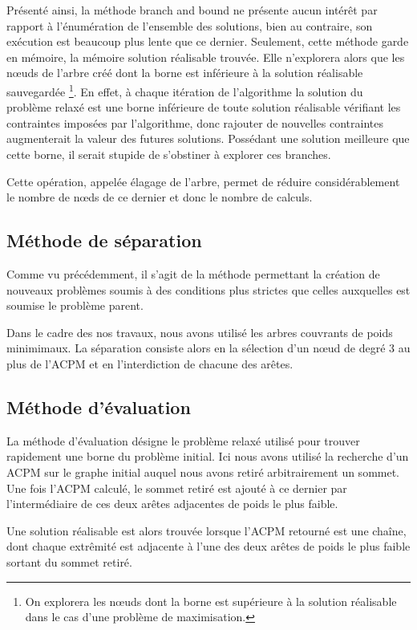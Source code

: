 Présenté ainsi, la méthode branch and bound ne présente aucun intérêt par rapport à l'énumération de
l'ensemble des solutions, bien au contraire, son exécution est beaucoup plus lente que ce dernier.
Seulement, cette méthode garde en mémoire, la mémoire solution réalisable trouvée. Elle n'explorera
alors que les n\oe uds de l'arbre créé dont la borne est inférieure à la solution réalisable
sauvegardée \footnote{On explorera les n\oe uds dont la borne est supérieure à la solution
réalisable dans le cas d'une problème de maximisation.}. En effet, à chaque itération de
l'algorithme la solution du problème relaxé est une borne inférieure de toute solution réalisable
vérifiant les contraintes imposées par l'algorithme, donc rajouter de nouvelles contraintes
augmenterait la valeur des futures solutions. Possédant une solution meilleure que cette borne, il
serait stupide de s'obstiner à explorer ces branches. 

Cette opération, appelée élagage de l'arbre, permet de réduire considérablement le nombre de n\oe ds
de ce dernier et donc le nombre de calculs.

\subsection{Méthode de séparation}
Comme vu précédemment, il s'agit de la méthode permettant la création de nouveaux problèmes soumis à
des conditions plus strictes que celles auxquelles est soumise le problème parent.

Dans le cadre des nos travaux, nous avons utilisé les arbres couvrants de poids minimimaux. La
séparation consiste alors en la sélection d'un n\oe ud de degré 3 au plus de l'ACPM et en
l'interdiction de chacune des arêtes.

\subsection{Méthode d'évaluation}
La méthode d'évaluation désigne le problème relaxé utilisé pour trouver rapidement une borne du
problème initial. Ici nous avons utilisé la recherche d'un ACPM sur le graphe initial auquel nous
avons retiré arbitrairement un sommet. Une fois l'ACPM calculé, le sommet retiré est ajouté à
ce dernier par l'intermédiaire de ces deux arêtes adjacentes de poids le plus faible.

Une solution réalisable est alors trouvée lorsque l'ACPM retourné est une chaîne, dont chaque
extrêmité est adjacente à l'une des deux arêtes de poids le plus faible sortant du sommet retiré.


